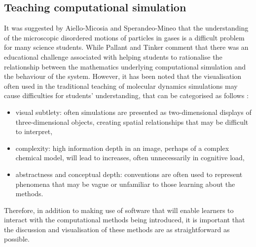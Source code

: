 \subsection{Teaching computational simulation}
It was suggested by Aiello-Micosia and Sperandeo-Mineo \cite{aiello-nicosia_computer_1985} that the understanding of the microscopic disordered motions of particles in gases is a difficult problem for many science students.
While Pallant and Tinker \cite{pallant_reasoning_2004} comment that there was an educational challenge associated with helping students to rationalise the relationship between the mathematics underlying computational simulation and the behaviour of the system.
However, it has been noted that the visualisation often used in the traditional teaching of molecular dynamics simulations may cause difficulties for students' understanding, that can be categorised as follows \cite{jones_molecular_2005}:
\begin{itemize}
\item visual subtlety: often simulations are presented as two-dimensional displays of three-dimensional objects, creating spatial relationships that may be difficult to interpret,
\item complexity: high information depth in an image, perhaps of a complex chemical model, will lead to increases, often unnecessarily in cognitive load,
\item abstractness and conceptual depth: conventions are often used to represent phenomena that may be vague or unfamiliar to those learning about the methods.
\end{itemize}
Therefore, in addition to making use of software that will enable learners to interact with the computational methods being introduced, it is important that the discussion and visualisation of these methods are as straightforward as possible.
